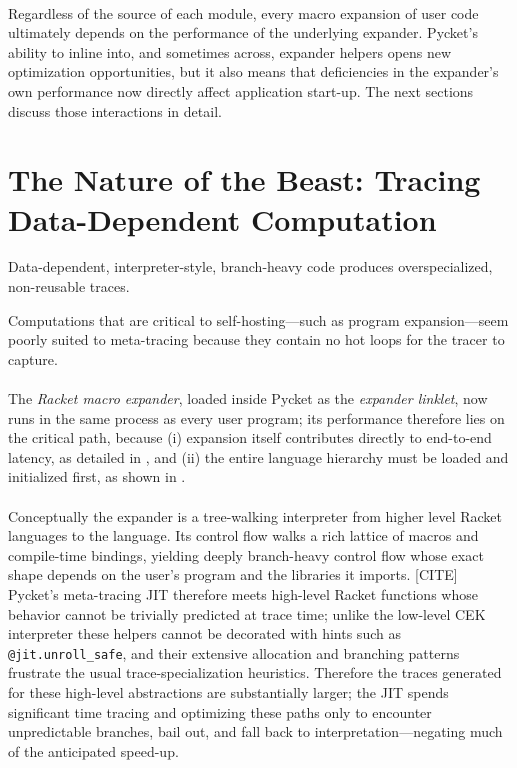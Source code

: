 		\paragraph{}%
			Regardless of the source of each module, every macro expansion of user code ultimately depends on the performance of the underlying expander. Pycket's ability to inline into, and sometimes across, expander helpers opens new optimization opportunities, but it also means that deficiencies in the expander's own performance now directly affect application start-up. The next sections discuss those interactions in detail.

	\section{The Nature of the Beast: Tracing Data-Dependent Computation}
	\label{section:nature-of-the-beast}

		\begin{sectionpoint}
			Data-dependent, interpreter-style, branch-heavy code produces overspecialized, non-reusable traces.

			Computations that are critical to self-hosting—such as program expansion—seem poorly suited to meta-tracing because they contain no hot loops for the tracer to capture.
		\end{sectionpoint}

		\paragraph{}%
			The \emph{Racket macro expander}, loaded inside Pycket as the \emph{expander linklet}, now runs in the same process as every user program; its performance therefore lies on the critical path, because (i) expansion itself contributes directly to end-to-end latency, as detailed in , and (ii) the entire language hierarchy must be loaded and initialized first, as shown in .

		\paragraph{}%
			Conceptually the expander is a tree-walking interpreter from higher level Racket languages to the  language. Its control flow walks a rich lattice of macros and compile-time bindings, yielding deeply branch-heavy control flow whose exact shape depends on the user's program and the libraries it imports. [CITE] Pycket's meta-tracing JIT therefore meets high-level Racket functions whose behavior cannot be trivially predicted at trace time; unlike the low-level CEK interpreter these helpers cannot be decorated with hints such as \texttt{@jit.unroll\_safe}, and their extensive allocation and branching patterns frustrate the usual trace-specialization heuristics. Therefore the traces generated for these high-level abstractions are substantially larger; the JIT spends significant time tracing and optimizing these paths only to encounter unpredictable branches, bail out, and fall back to interpretation—negating much of the anticipated speed-up.


